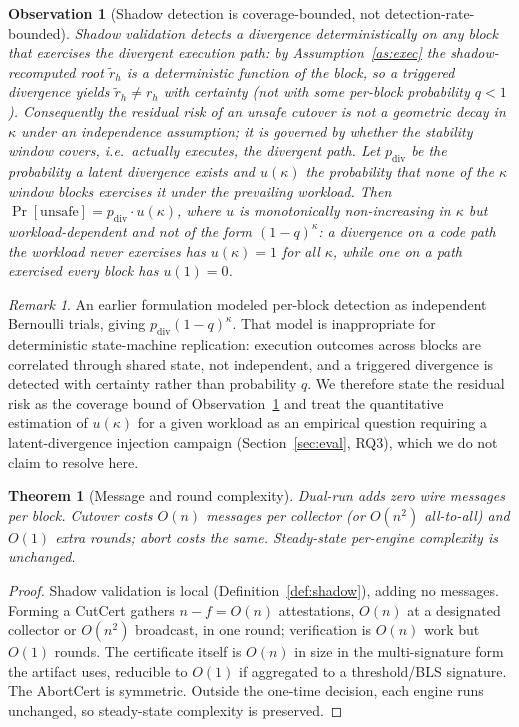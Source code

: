\documentclass[journal]{IEEEtran}
\newtheorem{theorem}{Theorem}
\newtheorem{observation}{Observation}
\theoremstyle{remark}
\newtheorem{remark}{Remark}
\begin{document}
\begin{observation}[Shadow detection is coverage-bounded, not detection-rate-bounded]
\label{th:detection}
Shadow validation detects a divergence \emph{deterministically} on any block that exercises the
divergent execution path: by Assumption~\ref{as:exec} the shadow-recomputed root $\tilde r_h$ is a
deterministic function of the block, so a triggered divergence yields $\tilde r_h\ne r_h$ with
certainty (not with some per-block probability $q<1$). Consequently the residual risk of an unsafe
cutover is not a geometric decay in $\kappa$ under an independence assumption; it is governed by
whether the stability window \emph{covers}, i.e.\ actually executes, the divergent path. Let
$p_{\mathrm{div}}$ be the probability a latent divergence exists and $u(\kappa)$ the probability that
none of the $\kappa$ window blocks exercises it under the prevailing workload. Then
$\Pr[\mathrm{unsafe}] = p_{\mathrm{div}}\cdot u(\kappa)$, where $u$ is monotonically non-increasing in
$\kappa$ but workload-dependent and \emph{not} of the form $(1-q)^{\kappa}$: a divergence on a code
path the workload never exercises has $u(\kappa)=1$ for all $\kappa$, while one on a path exercised
every block has $u(1)=0$.
\end{observation}

\begin{remark}
\label{rem:detection-indep}
An earlier formulation modeled per-block detection as independent Bernoulli trials, giving
$p_{\mathrm{div}}(1-q)^{\kappa}$. That model is inappropriate for deterministic state-machine
replication: execution outcomes across blocks are correlated through shared state, not independent,
and a triggered divergence is detected with certainty rather than probability $q$. We therefore state
the residual risk as the coverage bound of Observation~\ref{th:detection} and treat the quantitative
estimation of $u(\kappa)$ for a given workload as an empirical question requiring a latent-divergence
injection campaign (Section~\ref{sec:eval}, RQ3), which we do not claim to resolve here.
\end{remark}

\begin{theorem}[Message and round complexity]
\label{th:complexity}
Dual-run adds zero wire messages per block. Cutover costs $O(n)$ messages per collector (or
$O(n^2)$ all-to-all) and $O(1)$ extra rounds; abort costs the same. Steady-state per-engine
complexity is unchanged.
\end{theorem}
\begin{proof}
Shadow validation is local (Definition~\ref{def:shadow}), adding no messages. Forming a CutCert
gathers $n-f=O(n)$ attestations, $O(n)$ at a designated collector or $O(n^2)$ broadcast, in one
round; verification is $O(n)$ work but $O(1)$ rounds. The certificate itself is $O(n)$ in size in the
multi-signature form the artifact uses, reducible to $O(1)$ if aggregated to a threshold/BLS signature.
The AbortCert is symmetric. Outside the one-time decision, each engine runs unchanged, so steady-state
complexity is preserved.
\end{proof}
\end{document}
